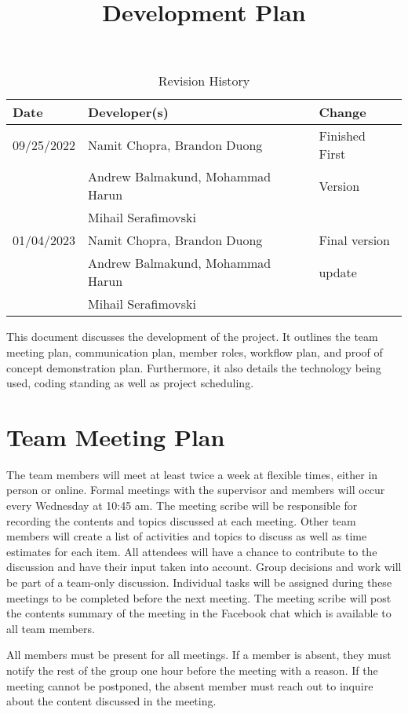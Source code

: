 \documentclass{article}
\title{Development Plan\\\progname}
\author{\authname}
\date{}
\begin{document}
\begin{table}[hp]
\caption{Revision History} \label{TblRevisionHistory}
\begin{tabularx}{\textwidth}{llX}
\toprule
\textbf{Date} & \textbf{Developer(s)} & \textbf{Change}\\
\midrule
09/25/2022 & Namit Chopra, Brandon Duong  & Finished First\\
 & Andrew Balmakund, Mohammad Harun &  Version\\
 & Mihail Serafimovski & \\
 01/04/2023 & Namit Chopra, Brandon Duong  & Final version\\
 & Andrew Balmakund, Mohammad Harun &  update\\
 & Mihail Serafimovski & \\
\bottomrule
\end{tabularx}
\end{table}

\newpage

\maketitle

This document discusses the development of the project. It outlines the team meeting plan, communication plan, member roles, workflow plan, and proof of concept demonstration plan. Furthermore, it also details the technology being used, coding standing as well as project scheduling.


\section{Team Meeting Plan}
The team members will meet at least twice a week at flexible times, either in person or online. Formal meetings with the supervisor and members will occur every Wednesday at 10:45 am. The meeting scribe will be responsible for recording the contents and topics discussed at each meeting. Other team members will create a list of activities and topics to discuss as well as time estimates for each item. All attendees will have a chance to contribute to the discussion and have their input taken into account. Group decisions and work will be part of a team-only discussion. Individual tasks will be assigned during these meetings to be completed before the next meeting. The meeting scribe will post the contents summary of the meeting in the Facebook chat which is available to all team members.

All members must be present for all meetings. If a member is absent, they must notify the rest of the group one hour before the meeting with a reason. If the meeting cannot be postponed, the absent member must reach out to inquire about the content discussed in the meeting.
\end{document}
